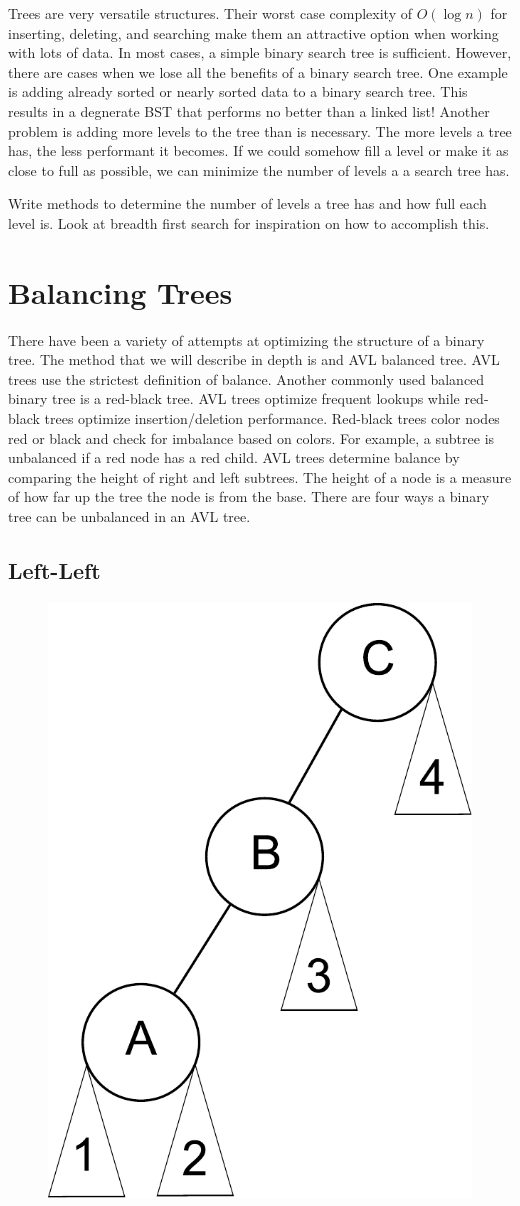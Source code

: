 \label{lab:btrees}

Trees are very versatile structures.  
Their worst case complexity of $O(\log n)$ for inserting, deleting, and searching make them an attractive option when working with lots of data.
In most cases, a simple binary search tree is sufficient.
However, there are cases when we lose all the benefits of a binary search tree.
One example is adding already sorted or nearly sorted data to a binary search tree.
This results in a degnerate BST that performs no better than a linked list!
Another problem is adding more levels to the tree than is necessary.
The more levels a tree has, the less performant it becomes.  If we could somehow fill a level or make it as close to full as possible, we can minimize the number of levels a a search tree has.

\begin{problem}
Write methods to determine the number of levels a tree has and how full each level is.  Look at breadth first search for inspiration on how to accomplish this.
\end{problem}

\section*{Balancing Trees}
There have been a variety of attempts at optimizing the structure of a binary tree.
The method that we will describe in depth is and AVL balanced tree.
AVL trees use the strictest definition of balance.
Another commonly used balanced binary tree is a red-black tree.  AVL trees optimize frequent lookups while red-black trees optimize insertion/deletion performance.
Red-black trees color nodes red or black and check for imbalance based on colors.  For example, a subtree is unbalanced if a red node has a red child.
AVL trees determine balance by comparing the height of right and  left subtrees.
The height of a node is a measure of how far up the tree the node is from the base.
There are four ways a binary tree can be unbalanced in an AVL tree.

\subsection*{Left-Left}
\begin{figure}[h]
\centering
\includegraphics[width=.33\textwidth]{left_left.pdf}
\end{figure}


